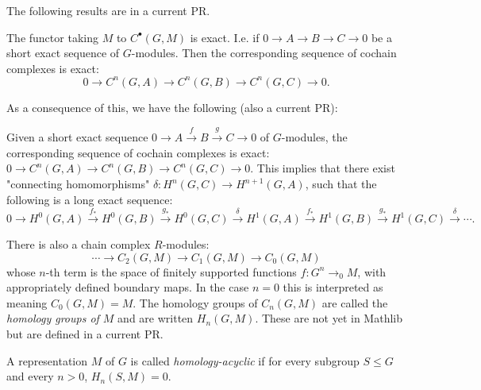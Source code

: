The following results are in a current PR.

\begin{lemma}
  \label{lem:cochainsFunctor exact}
  The functor taking $M$ to $C^\bullet (G,M)$ is exact.
  I.e. if $0 \to A \to B \to C \to 0$ be a short exact sequence of $G$-modules.
  Then the corresponding sequence of cochain complexes is exact:
  \[
    0 \to C^n(G,A) \to C^n(G,B) \to C^n(G,C) \to 0.
  \]
\end{lemma}

As a consequence of this, we have the following (also a current PR):

\begin{definition}
  \label{def:cohomology Long exact sequence}
  Given a short exact sequence $0 \to A \stackrel{f}\to B \stackrel{g}\to C \to 0$ of $G$-modules,
  the corresponding sequence of cochain complexes is exact:
  $0 \to C^n(G,A) \to C^n(G,B) \to C^n(G,C) \to 0$.
  This implies that there exist "connecting homomorphisms" $\delta : H^n(G,C) \to H^{n+1}(G,A)$,
  such that the following is a long exact sequence:
  \[
    0 \to H^0(G,A) \stackrel{f_*}\to H^0(G,B) \stackrel{g_*}\to H^0(G,C) \stackrel{\delta}\to
    H^1(G,A) \stackrel{f_*}\to H^1(G,B) \stackrel{g_*} \to H^1(G,C) \stackrel{\delta}\to \cdots.
  \]
\end{definition}


\begin{definition}
	\label{def:group homology}
	There is also a chain complex $R$-modules:
	\[
		\cdots \to C_2(G,M) \to C_1(G,M) \to C_0(G,M)
	\]
	whose $n$-th term is the space of finitely supported functions
	$f : G^n \to_0 M$, with appropriately defined boundary maps.
	In the case $n=0$ this is interpreted as meaning $C_0(G,M) = M$.
	The homology groups of $C_n(G,M)$ are called the \emph{homology groups of $M$}
	and are written $H_n(G,M)$.
	These are not yet in Mathlib but are defined in a current PR.
\end{definition}


\begin{definition}
	\label{def:homology-acyclic}
	\leanok
	A representation $M$ of $G$ is called \emph{homology-acyclic} if for every subgroup $S \le G$
	and every $n > 0$, $H_n(S,M) = 0$.
\end{definition}



